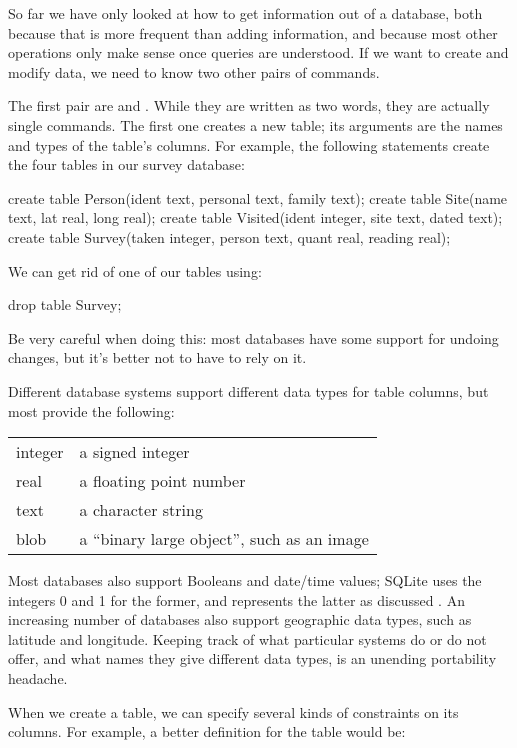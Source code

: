 So far we have only looked at how to get information out of a database,
both because that is more frequent than adding information, and because
most other operations only make sense once queries are understood. If we
want to create and modify data, we need to know two other pairs of
commands.

The first pair are  and . While
they are written as two words, they are actually single commands. The
first one creates a new table; its arguments are the names and types of
the table's columns. For example, the following statements create the
four tables in our survey database:

\begin{VerbIn}
create table Person(ident text, personal text, family text);
create table Site(name text, lat real, long real);
create table Visited(ident integer, site text, dated text);
create table Survey(taken integer, person text, quant real, reading real);
\end{VerbIn}

We can get rid of one of our tables using:

\begin{VerbIn}
drop table Survey;
\end{VerbIn}

Be very careful when doing this: most databases have some support for
undoing changes, but it's better not to have to rely on it.

Different database systems support different data types for table
columns, but most provide the following:

\begin{tabular}{ll}
integer & a signed integer \\
real & a floating point number \\
text & a character string \\
blob & a ``binary large object'', such as an image \\
\end{tabular}

Most databases also support Booleans and date/time values; SQLite uses
the integers 0 and 1 for the former, and represents the latter as
discussed . An increasing number of databases
also support geographic data types, such as latitude and longitude.
Keeping track of what particular systems do or do not offer, and what
names they give different data types, is an unending portability
headache.

When we create a table, we can specify several kinds of constraints on
its columns. For example, a better definition for the 
table would be:

